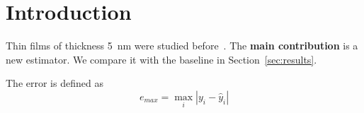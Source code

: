 \section{Introduction}
\label{sec:intro}
Thin films of thickness \SI{5}{\nano\metre} were studied before~\cite{Smith2021,lee2019}.
The \textbf{main contribution} is a new estimator.
We compare it with the baseline in Section~\ref{sec:results}.

The error is defined as
\begin{equation}
  e_{max} = \max_i |y_i - \hat{y}_i| \label{eq:err}
\end{equation}
